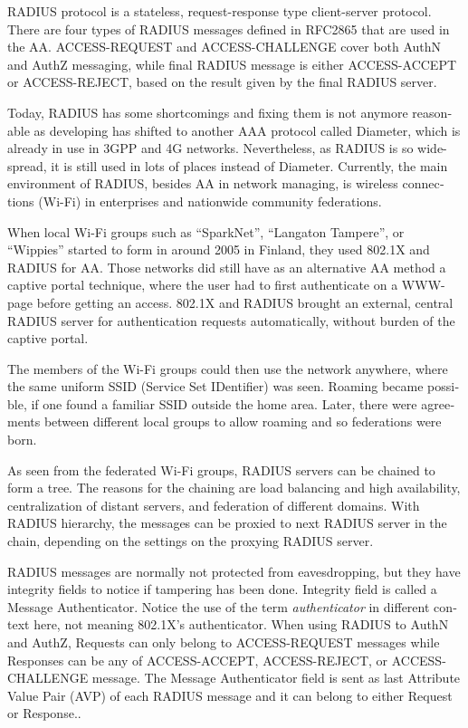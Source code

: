 \documentclass[12pt,a4paper,english]{tutthesis}
\begin{document}
\begin{otherlanguage}{english}
RADIUS protocol is a stateless, request-response type client-server
protocol. 
There are four types of RADIUS messages defined in RFC2865 that are
used in the AA. ACCESS-REQUEST and ACCESS-CHALLENGE cover both AuthN and
AuthZ messaging, while final RADIUS message is either
ACCESS-ACCEPT or ACCESS-REJECT, based on the
result given by the final RADIUS  server.

Today, RADIUS has some shortcomings and fixing them is not anymore
reasonable as developing has shifted to another AAA protocol called
Diameter, which is already in use in 3GPP and 4G
networks\cite{diameter}.  Nevertheless, as RADIUS is so wide-spread,
it is still used in lots of places instead of Diameter.  Currently,
the main environment of RADIUS, besides AA in network managing, is wireless
connections (Wi-Fi) in enterprises and nationwide community
federations.


When local Wi-Fi groups  such as ``SparkNet'', ``Langaton
Tampere'', or ``Wippies'' started to form  in around 2005 in Finland, they used
802.1X and RADIUS for AA. Those networks did still have as an
alternative AA method a captive portal technique, where the user had to
first authenticate on a WWW-page before getting an access.  802.1X and
RADIUS brought an external, central RADIUS server for authentication
requests automatically, without burden of the captive portal.

The members of the Wi-Fi groups could then use the network anywhere, where
the same uniform SSID (Service Set IDentifier) was seen. Roaming
became possible, if one found a familiar SSID outside the home area.
Later, there were agreements between different local groups to allow
roaming and so federations were born.

As seen from the federated Wi-Fi groups, RADIUS servers can be chained to
form a tree. The reasons for the chaining are load balancing and high
availability, centralization of distant servers, and
federation of different domains. With RADIUS hierarchy, the messages
can be proxied to next RADIUS server in the chain, depending on the settings
on the proxying RADIUS server.

RADIUS messages are normally not protected from eavesdropping, but they have
integrity fields to notice if tampering has been done. 
Integrity field is called a Message Authenticator.
Notice the use of the term \emph{authenticator} in different context here, not
meaning 802.1X's authenticator.
When using RADIUS to AuthN and AuthZ, Requests can only belong to ACCESS-REQUEST messages while
Responses can be any of ACCESS-ACCEPT, ACCESS-REJECT, or ACCESS-CHALLENGE message.
The Message Authenticator field is sent as last Attribute Value Pair (AVP)
of each RADIUS message and it can belong 
to either Request or Response.\cite[p.20]{radiusbook}.


\end{otherlanguage}
\end{document}
